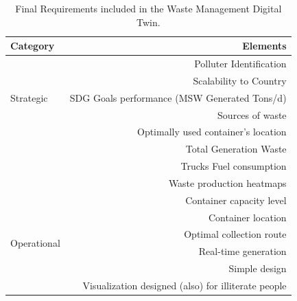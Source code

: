\documentclass[authoryear,preprint,review,11pt,doubleblind]{elsarticle}
\begin{document}
    \begin{table}[h!]
        \centering
        \caption{Final Requirements included in the Waste Management Digital Twin.}
        \scriptsize
        \label{tab:finalReq}
        \begin{tabularx}{\linewidth}{X r}
            \toprule
            Category&Elements\\
            \midrule
            \multirow{5}{*}{Strategic}&Polluter Identification\\
                                        &Scalability to Country\\
                                        &SDG Goals performance (MSW Generated Tons/d)\\
                                        &Sources of waste\\
            \midrule
            \multirow{4}{*}{Performance}&Optimally used container's location\\
                                        &Total Generation Waste\\
                                        &Trucks Fuel consumption\\
                                        &Waste production heatmaps\\
            \midrule
            \multirow{6}{*}{Operational}&Container capacity level\\
                                        &Container location\\
                                        &Optimal collection route\\
                                        &Real-time generation\\
                                        &Simple design\\
                                        &Visualization designed (also) for illiterate people\\
            \bottomrule        
        \end{tabularx}
    \end{table}

\end{document}
